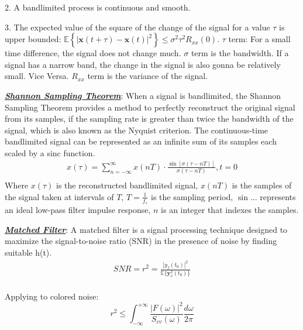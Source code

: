 \documentclass[12pt]{article}
\newcommand{\bulletPoint}[1]{\ul{\textit{\textbf{#1}}}}
\begin{document}
\begin{multicols*}{4}
2. A bandlimited process is continuous and smooth. 

3. The expected value of the square of the change of the signal for a value $\tau$ is upper bounded: $\mathbb{E} \left\{ | \mathbf{x}(t+\tau) - \mathbf{x}(t)|^2 \right\} \leq \sigma^2\tau^2R_{xx}(0)$. $\tau$ term: For a small time difference, the signal does not change much. $\sigma$ term is the bandwidth. If a signal has a narrow band, the change in the signal is also gonna be relatively small. Vice Versa. $R_{xx}$ term is the variance of the signal.


\bulletPoint{Shannon Sampling Theorem}: When a signal is bandlimited, the Shannon Sampling Theorem provides a method to perfectly reconstruct the original signal from its samples, if the sampling rate is greater than twice the bandwidth of the signal, which is also known as the Nyquist criterion. The continuous-time bandlimited signal can be represented as an infinite sum of its samples each scaled by a sinc function.
\useshortskip \begin{equation*}
    \begin{split}
        x(\tau) = \sum^{\infty}_{n=-\infty}x(nT)\cdot \frac{\sin[\sigma(\tau - nT)]}{\sigma(\tau-nT)}, t=0\\[-7pt]
    \end{split}
\end{equation*}
Where $x(\tau)$ is the reconstructed bandlimited signal, $x(nT)$ is the samples of the signal taken at intervals of $T$, $T = \frac{1}{f_s}$ is the sampling period, $\sin \ldots$ represents an ideal low-pass filter impulse response, $n$ is an integer that indexes the samples.


\bulletPoint{Matched Filter}: A matched filter is a signal processing technique designed to maximize the signal-to-noise ratio (SNR) in the presence of noise by finding suitable h(t).
\useshortskip \begin{equation*}
    \begin{split}
        SNR = r^2 = \frac{|y_f(t_0)|^2}{\mathbb{E}\{\mathbf{y}^2_v(t_0)\}}\\[-5pt]
    \end{split}
\end{equation*}

Applying to colored noise: 
\useshortskip \begin{equation*}
    r^2\leq \int^{+\infty}_{-\infty}\frac{|F(\omega)|^2}{S_{vv}(\omega)}\frac{d\omega}{2\pi}
\end{equation*}


\end{multicols*}
\end{document}

